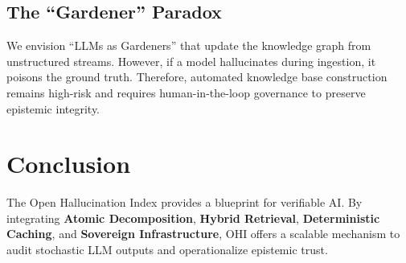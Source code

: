 \documentclass[10pt,a4paper,twocolumn]{article}
\begin{document}
\subsection{The \enquote{Gardener} Paradox}
We envision \enquote{LLMs as Gardeners} that update the knowledge graph from unstructured streams. However, if a model hallucinates during ingestion, it poisons the ground truth. Therefore, automated knowledge base construction remains high-risk and requires human-in-the-loop governance to preserve epistemic integrity.

\section*{Conclusion}
The Open Hallucination Index provides a blueprint for verifiable AI. By integrating \textbf{Atomic Decomposition}, \textbf{Hybrid Retrieval}, \textbf{Deterministic Caching}, and \textbf{Sovereign Infrastructure}, OHI offers a scalable mechanism to audit stochastic LLM outputs and operationalize epistemic trust.
\end{document}
